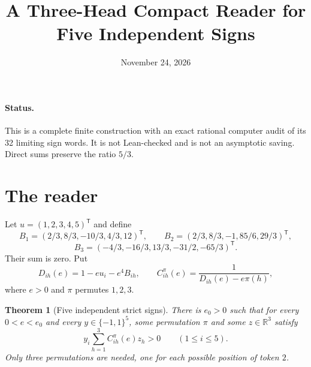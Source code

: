 \documentclass[11pt]{article}
\title{A Three-Head Compact Reader for Five Independent Signs}
\author{}
\date{November 24, 2026}
\newtheorem{theorem}{Theorem}
\begin{document}
\maketitle

\paragraph{Status.}
This is a complete finite construction with an exact rational computer
audit of its 32 limiting sign words. It is not Lean-checked and is not
an asymptotic saving. Direct sums preserve the ratio $5/3$.

\section{The reader}
Let $u=(1,2,3,4,5)^{\mathsf T}$ and define
\[
 B_1=(2/3,8/3,-10/3,4/3,12)^{\mathsf T},\qquad
 B_2=(2/3,8/3,-1,85/6,29/3)^{\mathsf T},
\]
\[
 B_3=(-4/3,-16/3,13/3,-31/2,-65/3)^{\mathsf T}.
 \tag{1}
\]
Their sum is zero. Put
\[
 D_{ih}(e)=1-eu_i-e^4B_{ih},\qquad
 C^\pi_{ih}(e)=\frac1{D_{ih}(e)-e\pi(h)}, \tag{2}
\]
where $e>0$ and $\pi$ permutes $1,2,3$.

\begin{theorem}[Five independent strict signs]
There is $e_0>0$ such that for every $0<e<e_0$ and every
$y\in\{-1,1\}^5$, some permutation $\pi$ and some $z\in\mathbb R^3$
satisfy
\[
 y_i\sum_{h=1}^3 C^\pi_{ih}(e)z_h>0\qquad(1\leq i\leq5). \tag{3}
\]
Only three permutations are needed, one for each possible position
of token $2$.
\end{theorem}
\end{document}
